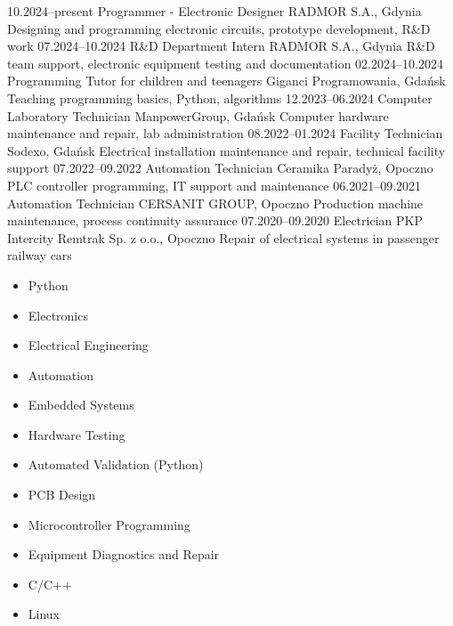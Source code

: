 \documentclass[9pt]{developercv}
\begin{document}

\begin{entrylist}
	\entry
		{10.2024--present}
		{Programmer - Electronic Designer}
		{RADMOR S.A., Gdynia}
		{Designing and programming electronic circuits, prototype development, R\&D work}
	\entry
		{07.2024--10.2024}
		{R\&D Department Intern}
		{RADMOR S.A., Gdynia}
		{R\&D team support, electronic equipment testing and documentation}
	\entry
		{02.2024--10.2024}
		{Programming Tutor for children and teenagers}
		{Giganci Programowania, Gdańsk}
		{Teaching programming basics, Python, algorithms}
	\entry
		{12.2023--06.2024}
		{Computer Laboratory Technician}
		{ManpowerGroup, Gdańsk}
		{Computer hardware maintenance and repair, lab administration}
	\entry
		{08.2022--01.2024}
		{Facility Technician}
		{Sodexo, Gdańsk}
		{Electrical installation maintenance and repair, technical facility support}
	\entry
		{07.2022--09.2022}
		{Automation Technician}
		{Ceramika Paradyż, Opoczno}
		{PLC controller programming, IT support and maintenance}
	\entry
		{06.2021--09.2021}
		{Automation Technician}
		{CERSANIT GROUP, Opoczno}
		{Production machine maintenance, process continuity assurance}
	\entry
		{07.2020--09.2020}
		{Electrician}
		{PKP Intercity Remtrak Sp. z o.o., Opoczno}
		{Repair of electrical systems in passenger railway cars}
\end{entrylist}




\begin{minipage}[t]{0.48\textwidth}
\begin{itemize}
  \item Python
  \item Electronics
  \item Electrical Engineering
  \item Automation
  \item Embedded Systems
  \item Hardware Testing
\end{itemize}
\end{minipage}%
\hfill
\begin{minipage}[t]{0.48\textwidth}
\begin{itemize}
  \item Automated Validation (Python)
  \item PCB Design
  \item Microcontroller Programming
  \item Equipment Diagnostics and Repair
  \item C/C++
  \item Linux
\end{itemize}
\end{minipage}
\end{document}
